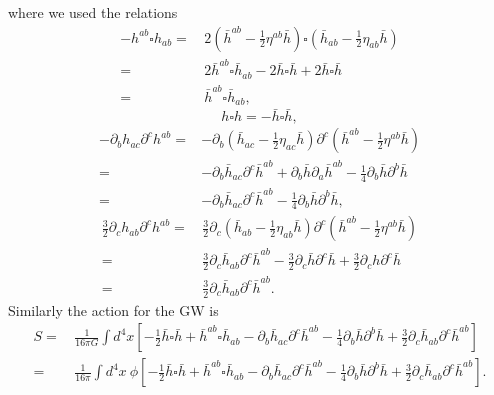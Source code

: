 \documentclass[
    jor,
    amsmath,amssymb,preprint,
    superscriptaddress,
]{revtex4-2}
\begin{document}
where we used the relations
\begin{equation}
    \begin{aligned}
        -h^{ab} \square h_{ab} = & \,2(\bar{h}^{ab}-\frac{1}{2}\eta^{ab}\bar{h})\square (\bar{h}_{ab} - \frac{1}{2}\eta_{ab}\bar{h}) \\
        = & \,2\bar{h}^{ab} \square \bar{h}_{ab} - 2 \bar{h}\square \bar{h} + 2\bar{h}\square \bar{h} \\
        = & \,\bar{h}^{ab} \square \bar{h}_{ab},
    \end{aligned}
\end{equation}
\begin{equation}
        h \square h = -\bar{h}\square \bar{h},
\end{equation}
\begin{equation}
    \begin{aligned}
        - \partial_b h_{ac}\partial^c h^{ab} = & -\partial_b(\bar{h}_{ac} - \frac{1}{2}\eta_{ac}\bar{h})\partial^c (\bar{h}^{ab}-\frac{1}{2}\eta^{ab}\bar{h}) \\
        = & - \partial_b \bar{h}_{ac}\partial^c \bar{h}^{ab} + \partial_b \bar{h}\partial_a\bar{h}^{ab} - \frac{1}{4}\partial_b\bar{h} \partial^b\bar{h} \\
        = & - \partial_b \bar{h}_{ac}\partial^c \bar{h}^{ab} - \frac{1}{4}\partial_b \bar{h} \partial^b \bar{h},
    \end{aligned}
\end{equation}
\begin{equation}
    \begin{aligned}
        \frac{3}{2}\partial_c h_{ab}\partial^c h^{ab}
        = & \,\frac{3}{2}\partial_c (\bar{h}_{ab} - \frac{1}{2}\eta_{ab}\bar{h}) \partial^c (\bar{h}^{ab}-\frac{1}{2}\eta^{ab}\bar{h}) \\
        = & \,\frac{3}{2}\partial_c \bar{h}_{ab}\partial^c \bar{h}^{ab} -\frac{3}{2}\partial_c \bar{h} \partial^c \bar{h} + \frac{3}{2}\partial_ch\partial^c \bar{h} \\
        = & \,\frac{3}{2}\partial_c \bar{h}_{ab}\partial^c \bar{h}^{ab}.
    \end{aligned}
\end{equation}
Similarly the action for the GW is
\begin{equation}
\begin{aligned}
S = & \,\frac{1}{16\pi G} \int d^4x\left[  -\frac{1}{2} \bar{h}\square \bar{h} + \bar{h}^{ab}\square \bar{h}_{ab} - \partial_b \bar{h}_{ac}\partial^c \bar{h}^{ab} - \frac{1}{4}\partial_b\bar{h} \partial^b\bar{h} + \frac{3}{2}\partial_c \bar{h}_{ab}\partial^c \bar{h}^{ab} \right] \\
= & \,\frac{1}{16\pi } \int d^4x ~ \phi\left[  -\frac{1}{2} \bar{h}\square \bar{h} + \bar{h}^{ab}\square \bar{h}_{ab} - \partial_b \bar{h}_{ac}\partial^c \bar{h}^{ab} - \frac{1}{4}\partial_b\bar{h} \partial^b\bar{h} + \frac{3}{2}\partial_c \bar{h}_{ab}\partial^c \bar{h}^{ab} \right].
\end{aligned}
\end{equation}
\end{document}
